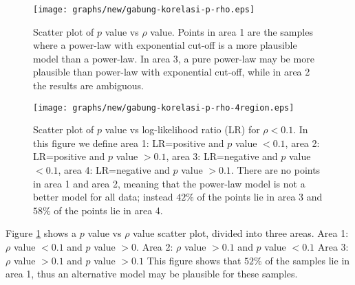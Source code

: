 \documentclass[paper]{ieice}
\begin{document}
\begin{figure}[tb]
\begin{center}
\texttt{[image: graphs/new/gabung-korelasi-p-rho.eps]}
\end{center}
\caption{Scatter plot of $p$ value vs $\rho$ value. 
        Points in area 1 are the samples where a power-law with exponential cut-off is a more plausible model than a power-law.
        In area 3, a pure power-law may be more plausible than power-law with exponential cut-off, while in area 2 the results are ambiguous.} 
\label{fig:scatter-pvalue-vs-rho}
\end{figure}

\begin{figure}[tb]
\begin{center}
\texttt{[image: graphs/new/gabung-korelasi-p-rho-4region.eps]}
\end{center}
\caption{Scatter plot of $p$ value vs log-likelihood ratio (LR) for $\rho < 0.1$. In this figure we define area 1: LR=positive and $p$ value $<0.1$, area 2: LR=positive and $p$ value $>0.1$, area 3: LR=negative and $p$ value $<0.1$, area 4: LR=negative and $p$ value $>0.1$. There are no points in area 1 and area 2, meaning that the power-law model is not a better model for all data; instead $42\%$ of the points lie in area 3 and $58\%$ of the points lie in area 4.} 
\label{fig:scatter-pvalue-vs-lr-for-rho-le-01}
\end{figure}

Figure \ref{fig:scatter-pvalue-vs-rho} shows a $p$ value vs $\rho$ value scatter plot, divided into three areas.
Area 1: $\rho$ value $<0.1$ and $p$ value $>0$. 
Area 2: $\rho$ value $>0.1$ and $p$ value $<0.1$
Area 3: $\rho$ value $>0.1$ and  $p$ value $>0.1$ 
This figure shows that $52\%$ of the samples lie in area 1, thus an alternative model may be plausible for these samples.
\end{document}
